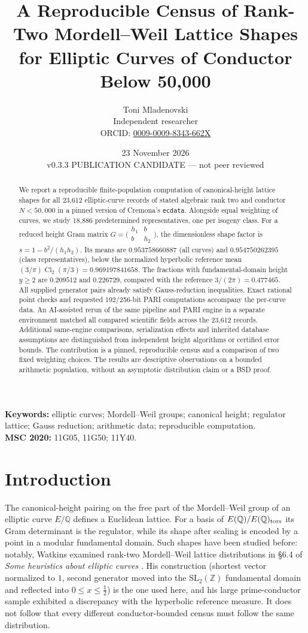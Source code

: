 \documentclass[11pt,a4paper]{article}
\title{A Reproducible Census of Rank-Two Mordell--Weil Lattice Shapes\\for Elliptic Curves of Conductor Below 50,000}
\author{Toni Mladenovski\\\small Independent researcher\\\small ORCID: \href{https://orcid.org/0009-0009-8343-662X}{0009-0009-8343-662X}}
\date{23 November 2026\\\small v0.3.3 PUBLICATION CANDIDATE --- not peer reviewed}
\newcommand{\Q}{\mathbb{Q}}
\newcommand{\ZZ}{\mathbb{Z}}
\newcommand{\Cl}{\operatorname{Cl}_2}
\begin{document}
\maketitle
\begin{abstract}
We report a reproducible finite-population computation of canonical-height lattice shapes for all 23,612 elliptic-curve records of stated algebraic rank two and conductor $N<50{,}000$ in a pinned version of Cremona's \texttt{ecdata}. Alongside equal weighting of curves, we study 18,886 predetermined representatives, one per isogeny class. For a reduced height Gram matrix $G=\bigl(\begin{smallmatrix}h_1&b\\b&h_2\end{smallmatrix}\bigr)$, the dimensionless shape factor is $s=1-b^2/(h_1h_2)$. Its means are $0.953758660887$ (all curves) and $0.954750262395$ (class representatives), below the normalized hyperbolic reference mean $(3/\pi)\Cl(\pi/3)=0.969197841658$. The fractions with fundamental-domain height $y\ge2$ are $0.209512$ and $0.226729$, compared with the reference $3/(2\pi)=0.477465$. All supplied generator pairs already satisfy Gauss-reduction inequalities. Exact rational point checks and requested 192/256-bit PARI computations accompany the per-curve data. An AI-assisted rerun of the same pipeline and PARI engine in a separate environment matched all compared scientific fields across the 23,612 records. Additional same-engine comparisons, serialization effects and inherited database assumptions are distinguished from independent height algorithms or certified error bounds. The contribution is a pinned, reproducible census and a comparison of two fixed weighting choices. The results are descriptive observations on a bounded arithmetic population, without an asymptotic distribution claim or a BSD proof.
\end{abstract}
\noindent\textbf{Keywords:} elliptic curves; Mordell--Weil groups; canonical height; regulator lattice; Gauss reduction; arithmetic data; reproducible computation.\\
\textbf{MSC 2020:} 11G05, 11G50; 11Y40.

\section{Introduction}
The canonical-height pairing on the free part of the Mordell--Weil group of an elliptic curve $E/\Q$ defines a Euclidean lattice. For a basis of $E(\Q)/E(\Q)_{\rm tors}$ its Gram determinant is the regulator, while its shape after scaling is encoded by a point in a modular fundamental domain. Such shapes have been studied before: notably, Watkins examined rank-two Mordell--Weil lattice distributions in \S6.4 of \emph{Some heuristics about elliptic curves} \cite{Watkins2008}. His construction (shortest vector normalized to $1$, second generator moved into the $\mathrm{SL}_2(\ZZ)$ fundamental domain and reflected into $0\le x\le\frac12$) is the one used here, and his large prime-conductor sample exhibited a discrepancy with the hyperbolic reference measure. It does not follow that every different conductor-bounded census must follow the same distribution.
\end{document}
